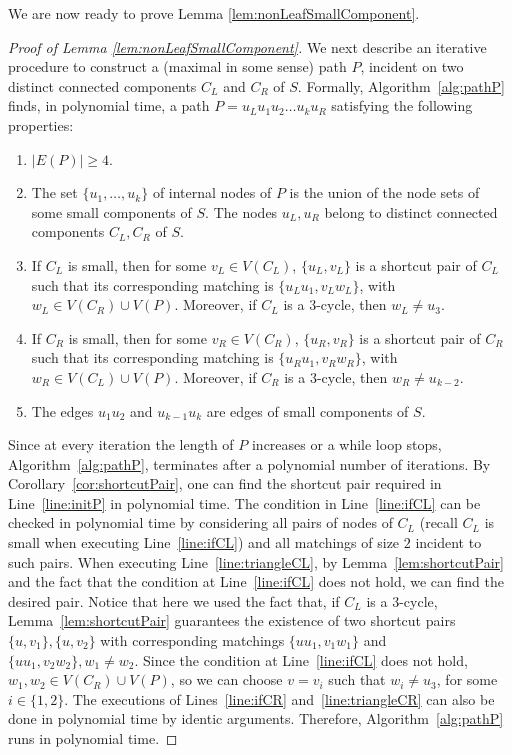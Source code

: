 \documentclass{theoretics}
\begin{document}
%
We are now ready to prove Lemma \ref{lem:nonLeafSmallComponent}.
\begin{proof}[Proof of Lemma \ref{lem:nonLeafSmallComponent}]
    We next describe an iterative procedure to construct a (maximal in some sense) path $P$, incident on two distinct connected components $C_L$ and $C_R$ of $S$. Formally, Algorithm~\ref{alg:pathP} finds, in polynomial time, a path $P = u_Lu_1u_2\dots u_ku_R$ satisfying the following properties:

    \begin{enumerate}
        \item $|E(P)|\geq 4$.\label{prp:pathLength}
        \item The set $\{u_1, \dots, u_k\}$ of internal nodes of $P$ is the union of the node sets of some small components of $S$. The nodes $u_L, u_R$ belong to distinct connected components $C_L, C_R$ of $S$.\label{prp:internalNodesP}
        \item If $C_L$ is small, then for some $v_L\in V(C_L)$, $\{u_L, v_L\}$ is a shortcut pair of $C_L$ such that its corresponding matching is $\{u_Lu_1, v_Lw_L\}$, with $w_L\in V(C_R)\cup V(P)$. Moreover, if $C_L$ is a $3$-cycle, then $w_L\neq u_3$.\label{prp:cl}
        \item If $C_R$ is small, then for some $v_R\in V(C_R)$, $\{u_R, v_R\}$ is a shortcut pair of $C_R$ such that its corresponding matching is $\{u_Ru_1, v_Rw_R\}$, with $w_R\in V(C_L)\cup V(P)$. Moreover, if $C_R$ is a $3$-cycle, then $w_R\neq u_{k-2}$.\label{prp:cr}
        \item The edges $u_1u_2$ and $u_{k-1}u_k$ are edges of small components of $S$.\label{prp:u2}
    \end{enumerate}

    Since at every iteration the length of $P$ increases or a while loop stops, Algorithm~\ref{alg:pathP}, terminates after a polynomial number of iterations. By Corollary~\ref{cor:shortcutPair}, one can find the shortcut pair required in Line~\ref{line:initP} in polynomial time. The condition in Line~\ref{line:ifCL} can be checked in polynomial time by considering all pairs of nodes of $C_L$ (recall $C_L$ is small when executing Line~\ref{line:ifCL}) and all matchings of size $2$ incident to such pairs. When executing Line~\ref{line:triangleCL}, by Lemma~\ref{lem:shortcutPair} and the fact that the condition at Line~\ref{line:ifCL} does not hold, we can find the desired pair. Notice that here we used the fact that, if $C_L$ is a $3$-cycle, Lemma~\ref{lem:shortcutPair} guarantees the existence of two shortcut pairs $\{u, v_1\}, \{u, v_2\}$ with corresponding matchings $\{uu_1, v_1w_1\}$ and $\{uu_1, v_2w_2\}, w_1\neq w_2$. Since the condition at Line~\ref{line:ifCL} does not hold, $w_1, w_2\in V(C_R)\cup V(P)$, so we can choose $v = v_i$ such that $w_i \neq u_3$, for some $i\in\{1, 2\}$. The executions of Lines~\ref{line:ifCR} and~\ref{line:triangleCR} can also be done in polynomial time by identic arguments. Therefore, Algorithm~\ref{alg:pathP} runs in polynomial time.


\end{proof}
\end{document}
